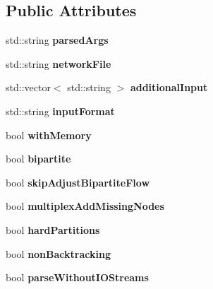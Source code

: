 \subsection*{Public Attributes}
\begin{DoxyCompactItemize}
\item 
\mbox{\label{structConfig_a34c78e4da739add92b836dd23758985a}} 
std\+::string {\bfseries parsed\+Args}
\item 
\mbox{\label{structConfig_af33e1d5b934fb64ecccd04022d7dbb7c}} 
std\+::string {\bfseries network\+File}
\item 
\mbox{\label{structConfig_a0cf4f0ef67bb8356d2e80ac50bf325c2}} 
std\+::vector$<$ std\+::string $>$ {\bfseries additional\+Input}
\item 
\mbox{\label{structConfig_acfb0fb09c43ecbe9067fcfbaad126665}} 
std\+::string {\bfseries input\+Format}
\item 
\mbox{\label{structConfig_ae2e715c2e70b81fcd4d0eb3a412a35c8}} 
bool {\bfseries with\+Memory}
\item 
\mbox{\label{structConfig_af697e6e74572e69e0a0488aa35589514}} 
bool {\bfseries bipartite}
\item 
\mbox{\label{structConfig_a986f4a0af644214e5a657550cde6dc4e}} 
bool {\bfseries skip\+Adjust\+Bipartite\+Flow}
\item 
\mbox{\label{structConfig_a01d27fd9091e2f819db3a11965a44ddf}} 
bool {\bfseries multiplex\+Add\+Missing\+Nodes}
\item 
\mbox{\label{structConfig_aac696129204f41f343fddd8b991c18a2}} 
bool {\bfseries hard\+Partitions}
\item 
\mbox{\label{structConfig_a3d26cf3c1876f2ce687ff56f68c1b95f}} 
bool {\bfseries non\+Backtracking}
\item 
\mbox{\label{structConfig_a49d13f3e543553c9f685de41a8a57a25}} 
bool {\bfseries parse\+Without\+I\+O\+Streams}
\item 

\end{DoxyCompactItemize}
